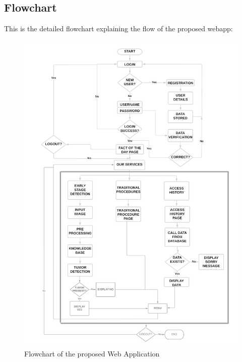 \subsection{Flowchart}
This is the detailed flowchart explaining the flow of the proposed webapp:
\begin{figure}[H]
\includegraphics[scale=0.085]{Photos/webapp_flowchart.png}
\caption{Flowchart of the proposed Web Application} \label{fig:webapp_flowchart}
\end{figure}

